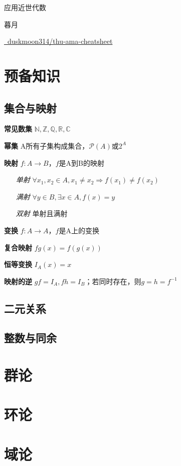 \documentclass[a4paper,10pt]{ctexart}
\newcommand*{\setN}{\mathbb{N}}
\newcommand*{\setZ}{\mathbb{Z}}
\newcommand*{\setQ}{\mathbb{Q}}
\newcommand*{\setR}{\mathbb{R}}
\newcommand*{\setC}{\mathbb{C}}
\newcommand*{\powerset}[1]{\mathscr{P}(#1)}
\newcommand*{\impl}{\Rightarrow}
\begin{document}
\begin{multicols}{3}
    \begin{center}
        {\Large 应用近世代数}

        暮月

        \href{https://github.com/duskmoon314/thu-ama-cheatsheet}{\faGithub \  duskmoon314/thu-ama-cheatsheet}
    \end{center}

    \section{预备知识}

    \subsection{集合与映射}

    \textbf{常见数集} $\setN, \setZ, \setQ, \setR, \setC$

    \textbf{幂集} A所有子集构成集合，$\powerset{A}$或$2^A$

    \textbf{映射} $f: A \to B$，$f$是A到B的映射

    \begin{itemize}
        \item[\emph{单射}] $\forall x_1, x_2 \!\in\! A, x_1 \!\neq\! x_2 \!\impl\! f(x_1) \!\neq\! f(x_2) $
        \item[\emph{满射}] $\forall y \in B, \exists x \in A, f(x) = y$
        \item[\emph{双射}] 单射且满射
    \end{itemize}

    \textbf{变换} $f: A \to A$，$f$是A上的变换

    \textbf{复合映射} $fg(x) = f(g(x))$

    \textbf{恒等变换} $I_A(x) = x$

    \textbf{映射的逆} $gf=I_A, fh=I_B$；若同时存在，则$g=h=f^{-1}$

    \subsection{二元关系}

    \subsection{整数与同余}

    \section{群论}

    \section{环论}

    \section{域论}

\end{multicols}
\end{document}
